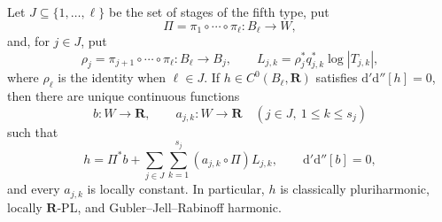 \begin{theorem}
Let $J\subseteq\{1,\ldots,\ell\}$ be the set of stages of the fifth
type, put
\[
 \Pi=\pi_1\circ\cdots\circ\pi_\ell:B_\ell\longrightarrow W,
\]
and, for $j\in J$, put
\[
 \rho_j=\pi_{j+1}\circ\cdots\circ\pi_\ell:B_\ell\longrightarrow B_j,
 \qquad
 L_{j,k}=\rho_j^*q_{j,k}^*\log|T_{j,k}|,
\]
where $\rho_\ell$ is the identity when $\ell\in J$.  If
$h\in C^0(B_\ell,\mathbf R)$ satisfies
$\mathrm d'\mathrm d''[h]=0$, then there are unique continuous functions
\[
 b:W\to\mathbf R,
 \qquad a_{j,k}:W\to\mathbf R\quad(j\in J,\ 1\leq k\leq s_j)
\]
such that
\[
 h=\Pi^*b+
   \sum_{j\in J}\sum_{k=1}^{s_j}(a_{j,k}\circ\Pi)L_{j,k},
 \qquad \mathrm d'\mathrm d''[b]=0,
\]
and every $a_{j,k}$ is locally constant.  In particular, $h$ is
classically pluriharmonic, locally $\mathbf R$-PL, and
Gubler--Jell--Rabinoff harmonic.
\end{theorem}
